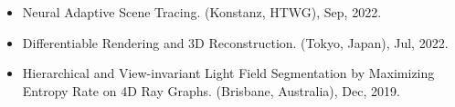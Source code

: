 \begin{itemize}
	\item Neural Adaptive Scene Tracing. (Konstanz, HTWG), Sep, 2022.
	\item Differentiable Rendering and 3D Reconstruction. (Tokyo, Japan), Jul, 2022.
	\item Hierarchical and View-invariant Light Field Segmentation by Maximizing Entropy Rate on 4D Ray Graphs. (Brisbane, Australia), Dec, 2019.
\end{itemize}
